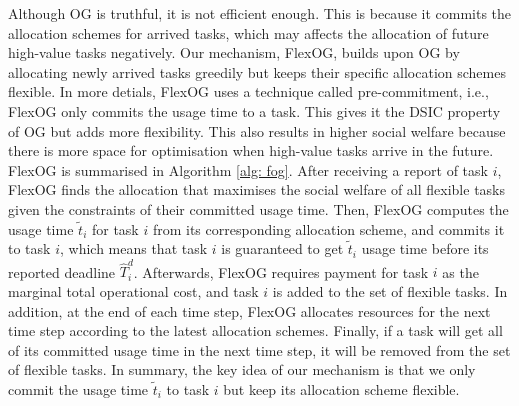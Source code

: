 \documentclass[11pt]{phdthesis}
\begin{document}
Although OG is truthful, it is not efficient enough. This is because it commits the allocation schemes for arrived tasks, which may affects the allocation of future high-value tasks negatively. Our mechanism, FlexOG, builds upon OG by allocating newly arrived tasks greedily but keeps their specific allocation schemes flexible. In more detials, FlexOG uses a technique called pre-commitment, i.e., FlexOG only commits the usage time to a task. This gives it the DSIC property of OG but adds more flexibility. This also results in higher social welfare because there is more space for optimisation when high-value tasks arrive in the future. FlexOG is summarised in Algorithm \ref{alg: fog}. After receiving a report of task $ i $, FlexOG finds the allocation that maximises the social welfare of all flexible tasks given the constraints of their committed usage time. Then, FlexOG computes the usage time $ \tilde{t}_i $ for task $ i $ from its corresponding allocation scheme, and commits it to task $ i $, which means that task $ i $ is guaranteed to get $ \tilde{t}_i $ usage time before its reported deadline $ \hat{T}_i^d $. Afterwards, FlexOG requires payment for task $ i $ as the marginal total operational cost, and task $ i $ is added to the set of flexible tasks. In addition, at the end of each time step, FlexOG allocates resources for the next time step according to the latest allocation schemes. Finally, if a task will get all of its committed usage time in the next time step, it will be removed from the set of flexible tasks. In summary, the key idea of our mechanism is that we only commit the usage time $\tilde{t}_{i}$ to task $ i $ but keep its allocation scheme flexible.

\end{document}

